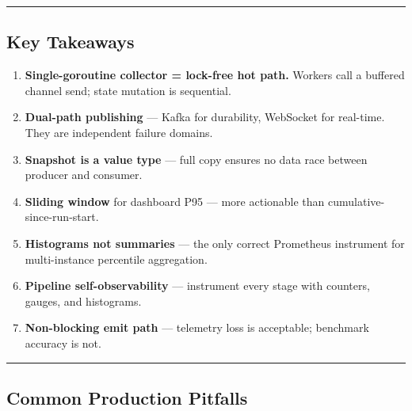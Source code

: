 \documentclass[
]{article}
\providecommand{\tightlist}{%
  \setlength{\itemsep}{0pt}\setlength{\parskip}{0pt}}
\begin{document}
\begin{center}\rule{0.5\linewidth}{0.5pt}\end{center}

\hypertarget{key-takeaways}{%
\subsection{Key Takeaways}\label{key-takeaways}}

\begin{enumerate}
\def\labelenumi{\arabic{enumi}.}
\tightlist
\item
  \textbf{Single-goroutine collector = lock-free hot path.} Workers call
  a buffered channel send; state mutation is sequential.
\item
  \textbf{Dual-path publishing} --- Kafka for durability, WebSocket for
  real-time. They are independent failure domains.
\item
  \textbf{Snapshot is a value type} --- full copy ensures no data race
  between producer and consumer.
\item
  \textbf{Sliding window} for dashboard P95 --- more actionable than
  cumulative-since-run-start.
\item
  \textbf{Histograms not summaries} --- the only correct Prometheus
  instrument for multi-instance percentile aggregation.
\item
  \textbf{Pipeline self-observability} --- instrument every stage with
  counters, gauges, and histograms.
\item
  \textbf{Non-blocking emit path} --- telemetry loss is acceptable;
  benchmark accuracy is not.
\end{enumerate}

\begin{center}\rule{0.5\linewidth}{0.5pt}\end{center}

\hypertarget{common-production-pitfalls}{%
\subsection{Common Production
Pitfalls}\label{common-production-pitfalls}}
\end{document}
